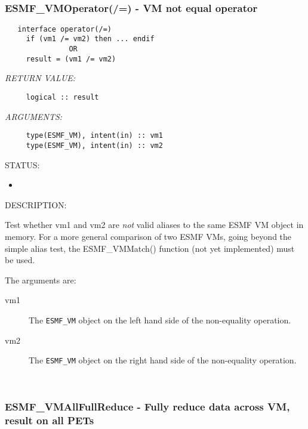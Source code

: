  
\mbox{}\hrulefill\ 
 
\subsubsection [ESMF\_VMOperator(/=)] {ESMF\_VMOperator(/=) - VM not equal operator}


  
\begin{verbatim}   interface operator(/=)
     if (vm1 /= vm2) then ... endif
               OR
     result = (vm1 /= vm2)\end{verbatim}{\em RETURN VALUE:}
\begin{verbatim}     logical :: result\end{verbatim}{\em ARGUMENTS:}
\begin{verbatim}     type(ESMF_VM), intent(in) :: vm1
     type(ESMF_VM), intent(in) :: vm2\end{verbatim}
{\sf STATUS:}
   \begin{itemize}
   \item{}
   \end{itemize}
  
{\sf DESCRIPTION:\\ }


     Test whether vm1 and vm2 are {\it not} valid aliases to the
     same ESMF VM object in memory. For a more general comparison of two ESMF
     VMs, going beyond the simple alias test, the ESMF\_VMMatch() function
     (not yet implemented) must be used.
  
     The arguments are:
     \begin{description}
     \item[vm1]
       The {\tt ESMF\_VM} object on the left hand side of the non-equality
       operation.
     \item[vm2]
       The {\tt ESMF\_VM} object on the right hand side of the non-equality
       operation.
     \end{description}
   
 
\mbox{}\hrulefill\ 
 
\subsubsection [ESMF\_VMAllFullReduce] {ESMF\_VMAllFullReduce - Fully reduce data across VM, result on all PETs}


